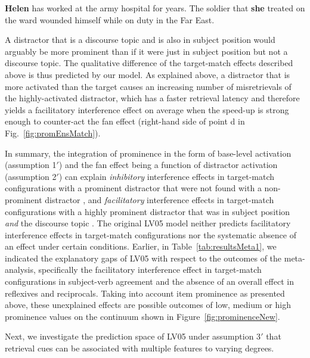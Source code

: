 \documentclass{cambridge7A}\usepackage[]{graphicx}\usepackage[]{color}
\newcommand{\revised}[1]{#1}
\newcommand{\revFE}[1]{#1}
\begin{document}
\begin{exe} 
\ex\label{ex:cf13:ex2baseline}
\textbf{Helen} has worked at the army hospital for years. The soldier that \textbf{she} treated on the ward wounded himself while on duty in the Far East.
\end{exe}

A distractor \revised{that is a discourse topic and}  is also in subject position would arguably be more prominent than if it were just in subject position but not \revised{a discourse topic}. The qualitative difference of the target-match effects described above is thus predicted by our model. 
\revFE{As explained above, a distractor that is more activated than the target causes an increasing number of misretrievals of the highly-activated distractor, which has a faster retrieval latency and therefore yields a facilitatory interference effect on average when the speed-up is strong enough to counter-act the fan effect (right-hand side of point d in Fig.~\ref{fig:promEnsMatch}).}


In summary, the integration of prominence in the form of \revFE{base-level} activation \revFE{(assumption 1$'$) and the fan effect being a function of distractor activation (assumption 2$'$)} can explain \emph{inhibitory} interference effects in target-match configurations with a prominent distractor that were not found with a non-prominent distractor \citep{VanDykeMcElree2011,PatilVasishthLewis2016,JaegerEngelmannVasishth2015}, and \emph{facilitatory} interference effects in target-match configurations with a highly prominent distractor that was in subject position \emph{and} the discourse topic \citep{CunningsFelser2013,Sturt2003}.
The original LV05 model neither predicts facilitatory interference effects in target-match configurations nor the systematic absence of an effect under certain conditions.
Earlier, in Table~\ref{tab:resultsMeta1}, we indicated the explanatory gaps of LV05 with respect to the outcomes of the \cite{JaegerEngelmannVasishth2017} meta-analysis, specifically the facilitatory interference effect in target-match configurations in subject-verb agreement and the absence of an overall effect in reflexives and reciprocals. 
Taking into account item prominence as presented above, these unexplained effects are possible outcomes of low, medium or high prominence values on the continuum shown in Figure~\ref{fig:prominenceNew}.

\revFE{
Next, we investigate the prediction space of LV05 under assumption 3$'$ that retrieval cues can be associated with multiple features to varying degrees.
}
\end{document}
